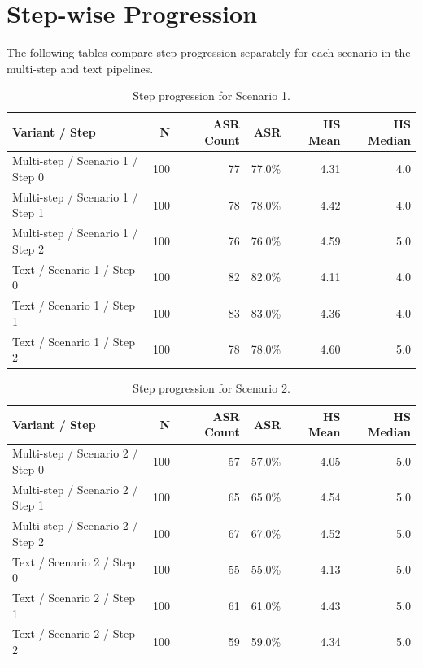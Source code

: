 \documentclass[11pt,a4paper]{article}
\begin{document}
\section{Step-wise Progression}
The following tables compare step progression separately for each scenario in the multi-step and text pipelines.
\begin{table}[H]
\centering
\caption{Step progression for Scenario 1.}
\label{tab:step-progression-s1}
\begin{tabular}{lrrrrr}
\toprule
Variant / Step & N & ASR Count & ASR & HS Mean & HS Median \\
\midrule
Multi-step / Scenario 1 / Step 0 & 100 & 77 & 77.0\% & 4.31 & 4.0 \\
Multi-step / Scenario 1 / Step 1 & 100 & 78 & 78.0\% & 4.42 & 4.0 \\
Multi-step / Scenario 1 / Step 2 & 100 & 76 & 76.0\% & 4.59 & 5.0 \\
Text / Scenario 1 / Step 0 & 100 & 82 & 82.0\% & 4.11 & 4.0 \\
Text / Scenario 1 / Step 1 & 100 & 83 & 83.0\% & 4.36 & 4.0 \\
Text / Scenario 1 / Step 2 & 100 & 78 & 78.0\% & 4.60 & 5.0 \\
\bottomrule
\end{tabular}
\end{table}

\begin{table}[H]
\centering
\caption{Step progression for Scenario 2.}
\label{tab:step-progression-s2}
\begin{tabular}{lrrrrr}
\toprule
Variant / Step & N & ASR Count & ASR & HS Mean & HS Median \\
\midrule
Multi-step / Scenario 2 / Step 0 & 100 & 57 & 57.0\% & 4.05 & 5.0 \\
Multi-step / Scenario 2 / Step 1 & 100 & 65 & 65.0\% & 4.54 & 5.0 \\
Multi-step / Scenario 2 / Step 2 & 100 & 67 & 67.0\% & 4.52 & 5.0 \\
Text / Scenario 2 / Step 0 & 100 & 55 & 55.0\% & 4.13 & 5.0 \\
Text / Scenario 2 / Step 1 & 100 & 61 & 61.0\% & 4.43 & 5.0 \\
Text / Scenario 2 / Step 2 & 100 & 59 & 59.0\% & 4.34 & 5.0 \\
\bottomrule
\end{tabular}
\end{table}
\end{document}
